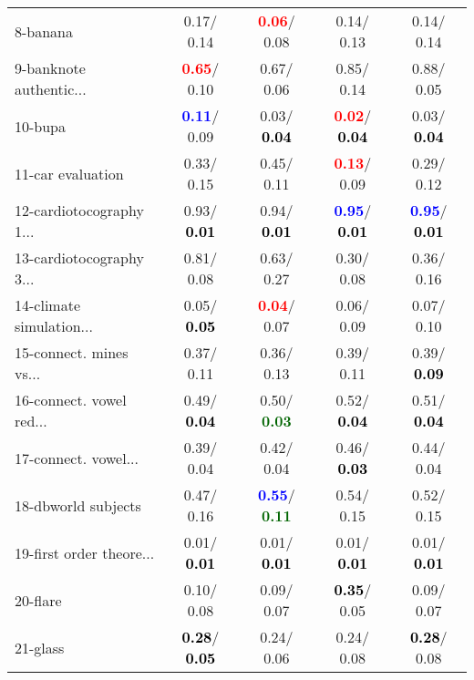 \begin{table}[h]
\begin{center}
\begin{tabular}{lc|c|c|c}
8-banana &   0.17/  0.14 & \textcolor{red}{\textbf{  0.06}}/  0.08 &   0.14/  0.13 &   0.14/  0.14 \\
9-banknote authentic... & \textcolor{red}{\textbf{  0.65}}/  0.10 &   0.67/  0.06 &   0.85/  0.14 &   0.88/  0.05 \\
10-bupa & \textcolor{blue}{\textbf{  0.11}}/  0.09 &   0.03/\textcolor{black}{\textbf{  0.04}} & \textcolor{red}{\textbf{  0.02}}/\textcolor{black}{\textbf{  0.04}} &   0.03/\textcolor{black}{\textbf{  0.04}} \\
11-car evaluation &   0.33/  0.15 &   0.45/  0.11 & \textcolor{red}{\textbf{  0.13}}/  0.09 &   0.29/  0.12 \\
12-cardiotocography 1... &   0.93/\textcolor{black}{\textbf{  0.01}} &   0.94/\textcolor{black}{\textbf{  0.01}} & \textcolor{blue}{\textbf{  0.95}}/\textcolor{black}{\textbf{  0.01}} & \textcolor{blue}{\textbf{  0.95}}/\textcolor{black}{\textbf{  0.01}} \\
13-cardiotocography 3... &   0.81/  0.08 &   0.63/  0.27 &   0.30/  0.08 &   0.36/  0.16 \\
14-climate simulation... &   0.05/\textcolor{black}{\textbf{  0.05}} & \textcolor{red}{\textbf{  0.04}}/  0.07 &   0.06/  0.09 &   0.07/  0.10 \\ \hline
15-connect. mines vs... &   0.37/  0.11 &   0.36/  0.13 &   0.39/  0.11 &   0.39/\textcolor{black}{\textbf{  0.09}} \\
16-connect. vowel red... &   0.49/\textcolor{black}{\textbf{  0.04}} &   0.50/\textcolor{darkgreen}{\textbf{  0.03}} &   0.52/\textcolor{black}{\textbf{  0.04}} &   0.51/\textcolor{black}{\textbf{  0.04}} \\
17-connect. vowel... &   0.39/  0.04 &   0.42/  0.04 &   0.46/\textcolor{black}{\textbf{  0.03}} &   0.44/  0.04 \\
18-dbworld subjects &   0.47/  0.16 & \textcolor{blue}{\textbf{  0.55}}/\textcolor{darkgreen}{\textbf{  0.11}} &   0.54/  0.15 &   0.52/  0.15 \\
19-first order theore... &   0.01/\textcolor{black}{\textbf{  0.01}} &   0.01/\textcolor{black}{\textbf{  0.01}} &   0.01/\textcolor{black}{\textbf{  0.01}} &   0.01/\textcolor{black}{\textbf{  0.01}} \\
20-flare &   0.10/  0.08 &   0.09/  0.07 & \textcolor{black}{\textbf{  0.35}}/  0.05 &   0.09/  0.07 \\
21-glass & \textcolor{black}{\textbf{  0.28}}/\textcolor{black}{\textbf{  0.05}} &   0.24/  0.06 &   0.24/  0.08 & \textcolor{black}{\textbf{  0.28}}/  0.08 \\ \hline

\end{tabular}
\end{center}
\end{table}
